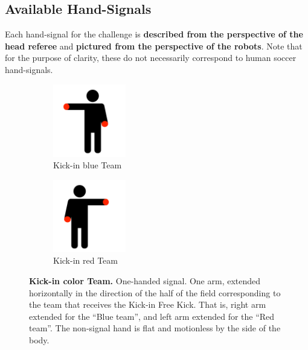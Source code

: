 \subsection{Available Hand-Signals}

Each hand-signal for the challenge is \textbf{described from the perspective of the head referee} and \textbf{pictured from the perspective of the robots}. Note that for the purpose of clarity, these do not necessarily correspond to human soccer hand-signals.

\begin{figure}[ht!]
    \centering
    \begin{subfigure}{.33\textwidth}
        \centering
        \includegraphics[height=120px]{figs/technical_challenges/kick-in.png}
        \caption{\color{blue}Kick-in \textlangle{}blue\textrangle{} Team}
    \end{subfigure}
    \begin{subfigure}{.33\textwidth}
        \centering
        \includegraphics[height=120px]{figs/technical_challenges/kick-in-flipped.png}
        \caption{\color{red}Kick-in \textlangle{}red\textrangle{} Team}
    \end{subfigure}
    \caption{\textbf{Kick-in \textlangle{}color\textrangle{} Team.} One-handed signal. One arm, extended horizontally in the direction of the half of the field corresponding to the team that receives the Kick-in Free Kick. That is, right arm extended for the ``Blue team'', and left arm extended for the ``Red team''. The non-signal hand is flat and motionless by the side of the body.}
\end{figure}
    
